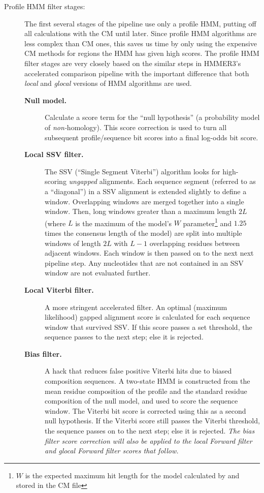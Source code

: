 \begin{description}
\item[Profile HMM filter stages:] The first several stages of the
  pipeline use only a profile HMM, putting off all calculations with
  the CM until later. Since profile HMM algorithms are less complex
  than CM ones, this saves us time by only using the expensive CM
  methods for regions the HMM has given high scores. The profile HMM
  filter stages are very closely based on the similar steps in
  HMMER3's accelerated comparison pipeline with the important
  difference that both \emph{local} and \emph{glocal} versions of HMM
  algorithms are used.
\begin{description}
\item[\textbf{Null model.}] Calculate a score term for the ``null
  hypothesis'' (a probability model of \emph{non-}homology). This
  score correction is used to turn all subsequent profile/sequence bit
  scores into a final log-odds bit score.
  
\item[\textbf{Local SSV filter.}] The SSV (``Single Segment Viterbi'')
  algorithm looks for high-scoring \emph{ungapped} alignments. Each
  sequence segment (referred to as a ``diagonal'') in a SSV alignment
  is extended slightly to define a window. Overlapping windows are
  merged together into a single window. Then, long windows greater
  than a maximum length $2L$ (where $L$ is the maximum of the model's
  $W$ parameter\footnote{$W$ is the expected maximum hit length for
  the model calculated by  and stored in the CM file}
  and $1.25$ times the consensus length of the model) are split into
  multiple windows of length $2L$ with $L-1$ overlapping residues
  between adjacent windows. Each window is then passed on to the next
  next pipeline step. Any nucleotides that are not contained in an SSV
  window are not evaluated further.

\item[\textbf{Local Viterbi filter.}] A more stringent accelerated
  filter. An optimal (maximum likelihood) gapped alignment score is
  calculated for each sequence window that survived SSV. If this score
  passes a set threshold, the sequence passes to the next step; else
  it is rejected.

\item[\textbf{Bias filter.}] A hack that reduces false positive
  Viterbi hits due to biased composition sequences. A two-state HMM is
  constructed from the mean residue composition of the profile and the
  standard residue composition of the null model, and used to score
  the sequence window. The Viterbi bit score is corrected using this
  as a second null hypothesis. If the Viterbi score still passes the
  Viterbi threshold, the sequence passes on to the next step; else it
  is rejected. \emph{The bias filter score correction will also be applied
  to the local Forward filter and glocal Forward filter scores that
  follow.}
  

\end{description}
\end{description}
